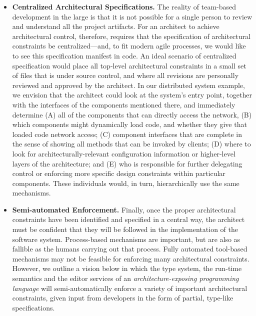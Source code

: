 \documentclass[runningheads]{llncs}
\begin{document}
\begin{sloppypar}
\begin{itemize}
\item \textbf{Centralized Architectural Specifications.}  The reality of team-based development in the large is that it is not possible for a single person to review and understand all the project artifacts.  For an architect to achieve architectural control, therefore, requires that the specification of architectural constraints be centralized---and, to fit modern agile processes, we would like to see this specification manifest in code.  An ideal scenario of centralized specification would place all top-level architectural constraints in a small set of files that is under source control, and where all revisions are personally reviewed and approved by the architect.  In our distributed system example, we envision that the architect could look at the system's entry point, together with the interfaces of the components mentioned there, and immediately determine (A) all of the components that can directly access the network, (B) which components might dynamically load code, and whether they give that loaded code network access; (C) component interfaces that are complete in the sense of showing all methods that can be invoked by clients; (D) where to look for architecturally-relevant configuration information or higher-level layers of the architecture; and (E) who is responsible for further delegating control or enforcing more specific design constraints within particular components. These individuals would, in turn, hierarchically use the same mechanisms.


\item \textbf{Semi-automated Enforcement.}  Finally, once the proper architectural constraints have been identified and specified in a central way, the architect must be confident that they will be followed in the implementation of the software system.  Process-based mechanisms are important, but are also as fallible as the humans carrying out that process.  Fully automated tool-based mechanisms may not be feasible for enforcing many architectural constraints.  However, we outline a vision below in which the type system, the run-time semantics and the editor services of an \emph{architecture-exposing programming language} will semi-automatically enforce a variety of important architectural constraints, given input from developers in the form of partial, type-like specifications.


\end{itemize}
\end{sloppypar}
\end{document}
